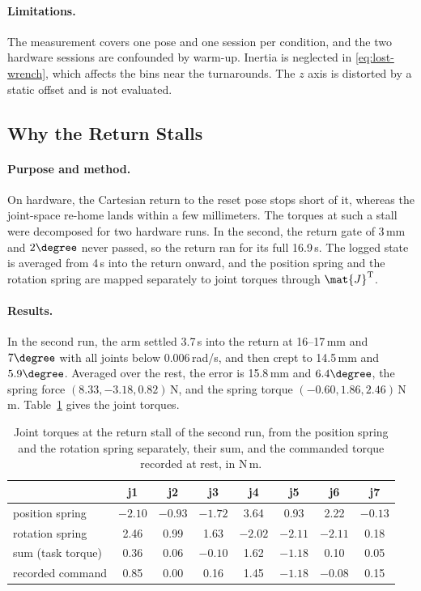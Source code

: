 \paragraph{Limitations.} The measurement covers one pose and one session per condition, and the two hardware sessions are confounded by warm-up. Inertia is neglected in \eqref{eq:lost-wrench}, which affects the bins near the turnarounds. The $z$ axis is distorted by a static offset and is not evaluated.

\subsection{Why the Return Stalls}\label{sec:app-ctrl-stall}

\paragraph{Purpose and method.} On hardware, the Cartesian return to the reset pose stops short of it, whereas the joint-space re-home lands within a few millimeters. The torques at such a stall were decomposed for two hardware runs. In the second, the return gate of 3\,mm and $2\degree$ never passed, so the return ran for its full 16.9\,s. The logged state is averaged from 4\,s into the return onward, and the position spring and the rotation spring are mapped separately to joint torques through $\mat{J}^{\mathrm{T}}$.

\paragraph{Results.} In the second run, the arm settled 3.7\,s into the return at 16--17\,mm and $7\degree$ with all joints below 0.006\,rad/s, and then crept to 14.5\,mm and $5.9\degree$. Averaged over the rest, the error is 15.8\,mm and $6.4\degree$, the spring force $(8.33,-3.18,0.82)$\,N, and the spring torque $(-0.60,1.86,2.46)$\,N\,m. Table~\ref{tab:ctrl-stall} gives the joint torques.

\begin{table}[!htbp]%
    \centering%
    \caption[Joint torques at a return stall]{Joint torques at the return stall of the second run, from the position spring and the rotation spring separately, their sum, and the commanded torque recorded at rest, in N\,m.}%
    \label{tab:ctrl-stall}%
    \small
    \begin{tabular}{lccccccc}
        \toprule
         & j1 & j2 & j3 & j4 & j5 & j6 & j7 \\
        \midrule
        position spring & $-2.10$ & $-0.93$ & $-1.72$ & 3.64 & 0.93 & 2.22 & $-0.13$ \\
        rotation spring & 2.46 & 0.99 & 1.63 & $-2.02$ & $-2.11$ & $-2.11$ & 0.18 \\
        sum (task torque) & 0.36 & 0.06 & $-0.10$ & 1.62 & $-1.18$ & 0.10 & 0.05 \\
        recorded command & 0.85 & 0.00 & 0.16 & 1.45 & $-1.18$ & $-0.08$ & 0.15 \\
        \bottomrule
    \end{tabular}
\end{table}%

